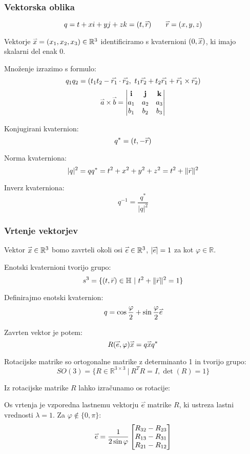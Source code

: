 \subsubsection*{Vektorska oblika}
\[ q = t+xi+yj+zk = (t, \accentset{\rightharpoonup}{r}) \qquad \accentset{\rightharpoonup}{r} = (x,y,z)\]

Vektorje $\accentset{\rightharpoonup}{x} = (x_1, x_2, x_3) \in \mathbb{R}^3$ identificiramo s kvaternioni $(0, \accentset{\rightharpoonup}{x})$, ki imajo skalarni del enak 0. 

Množenje izrazimo s formulo:
\[ q_1 q_2 = (t_1 t_2 - \accentset{\rightharpoonup}{r_1}\cdot \accentset{\rightharpoonup}{r_2},\ t_1 \accentset{\rightharpoonup}{r_2} + t_2 \accentset{\rightharpoonup}{r_1} + \accentset{\rightharpoonup}{r_1} \times \accentset{\rightharpoonup}{r_2})\]
\begin{align*}
	\accentset{\rightharpoonup}{a} \times \accentset{\rightharpoonup}{b} = \begin{vmatrix}
		\mathbf{i} & \mathbf{j} & \mathbf{k} \\
		a_1 & a_2 & a_3 \\
		b_1 & b_2 & b_3 \\
	\end{vmatrix}
\end{align*}

Konjugirani kvaternion:
\[ q^* = (t, -\accentset{\rightharpoonup}{r})\]

Norma kvaterniona:
\[ |q|^2 = q q^* = t^2+x^2+y^2+z^2 = t^2+\|\accentset{\rightharpoonup}{r}\|^2\]

Inverz kvaterniona:
\[ q^{-1} = \frac{q^*}{|q|^2}\]

\subsubsection*{Vrtenje vektorjev}
Vektor $\accentset{\rightharpoonup}{x} \in \mathbb{R}^3$ bomo zavrteli okoli osi $\accentset{\rightharpoonup}{e} \in \mathbb{R}^3$, $|\accentset{\rightharpoonup}{e}| = 1$ za kot $\varphi \in \mathbb{R}$.

Enotski kvaternioni tvorijo grupo:
\[s^3 = \{(t, \accentset{\rightharpoonup}{r}) \in \mathbb{H}\ |\ t^2 + \| \accentset{\rightharpoonup}{r}\|^2 = 1\}\]

Definirajmo enotski kvaternion:
\[ q = \cos\frac{\varphi}{2} + \sin\frac{\varphi}{2} \accentset{\rightharpoonup}{e} \]

Zavrten vektor je potem:
\[ R(\accentset{\rightharpoonup}{e}, \varphi) \accentset{\rightharpoonup}{x} = q \accentset{\rightharpoonup}{x} q^*\]


Rotacijske matrike so ortogonalne matrike z determinanto 1 in tvorijo grupo:
\[SO(3) = \{ R \in \mathbb{R}^{3\times 3}\ |\ R^TR = I, \det(R) = 1\}\]

Iz rotacijske matrike $R$ lahko izračunamo os rotacije:

Os vrtenja je vzporedna lastnemu vektorju $\accentset{\rightharpoonup}{e}$ matrike $R$, ki ustreza lastni vrednosti $\lambda = 1$.
Za $\varphi \notin \{0, \pi\}$:
\[\accentset{\rightharpoonup}{e} = \frac{1}{2 \sin \varphi} \begin{bmatrix}
	R_{32}-R_{23} \\
	R_{13}-R_{31} \\
	R_{21}-R_{12} \\
\end{bmatrix}\]

